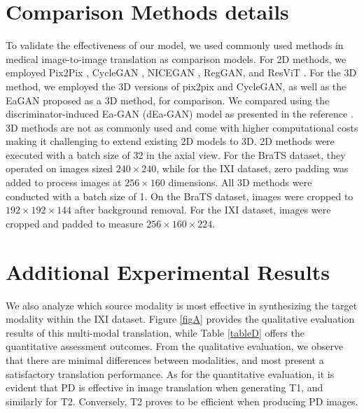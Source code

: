 \section{Comparison Methods details}
To validate the effectiveness of our model, we used commonly used methods in medical image-to-image translation as comparison models. For 2D methods, we employed Pix2Pix \cite{isola2017image}, CycleGAN \cite{zhu2017unpaired}, NICEGAN \cite{chen2020reusing}, RegGAN, \cite{NEURIPS2021_0f281810} and ResViT \cite{dalmaz2022resvit}. For the 3D method, we employed the 3D versions of pix2pix and CycleGAN, as well as the EaGAN proposed as a 3D method, for comparison.
We compared using the discriminator-induced Ea-GAN (dEa-GAN) model as presented in the reference \cite{yu2019ea}. 3D methods are not as commonly used and come with higher computational costs making it challenging to extend existing 2D models to 3D. 
2D methods were executed with a batch size of 32 in the axial view. For the BraTS dataset, they operated on images sized $240\times240$, while for the IXI dataset, zero padding was added to process images at $256\times160$ dimensions. All 3D methods were conducted with a batch size of 1. On the BraTS dataset, images were cropped to $192\times192\times144$ after background removal. For the IXI dataset, images were cropped and padded to measure $256\times160\times224$.

\vspace{1cm}

\section{Additional Experimental Results}
We also analyze which source modality is most effective in synthesizing the target modality within the IXI dataset. Figure \ref{figA} provides the qualitative evaluation results of this multi-modal translation, while Table \ref{tableD} offers the quantitative assessment outcomes. From the qualitative evaluation, we observe that there are minimal differences between modalities, and most present a satisfactory translation performance. As for the quantitative evaluation, it is evident that PD is effective in image translation when generating T1, and similarly for T2. Conversely, T2 proves to be efficient when producing PD images.
